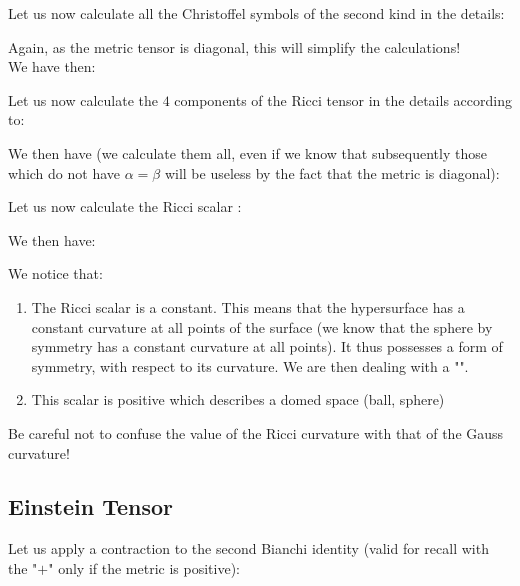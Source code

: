 	\begin{tcolorbox}[colframe=black,colback=white,sharp corners]
	
	Let us now calculate all the Christoffel symbols of the second kind in the details:
	
	Again, as the metric tensor is diagonal, this will simplify the calculations!\\

	We have then:
	
	Let us now calculate the $4$ components of the Ricci tensor in the details according to:
	
	We then have (we calculate them all, even if we know that subsequently those which do not have $\alpha=\beta$ will be useless by the fact that the metric is diagonal):
	
	\end{tcolorbox}
	
	
	\begin{tcolorbox}[colframe=black,colback=white,sharp corners]
	
	Let us now calculate the Ricci scalar :
	
	We then have:
	
	We notice that:
	\begin{enumerate}
		\item The Ricci scalar is a constant. This means that the hypersurface has a constant curvature at all points of the surface (we know that the sphere by symmetry has a constant curvature at all points). It thus possesses a form of symmetry, with respect to its curvature. We are then dealing with a "".

		\item This scalar is positive which describes a domed space (ball, sphere)
	\end{enumerate}
	\end{tcolorbox}
	\begin{tcolorbox}[title=Remark,colframe=black,arc=10pt]
	Be careful not to confuse the value of the Ricci curvature with that of the Gauss curvature!
	\end{tcolorbox}
	
	\subsection{Einstein Tensor}\label{einstein tensor}
	Let us apply a contraction to the second Bianchi  identity (valid for recall with the "$+$" only if the metric is positive):
	
